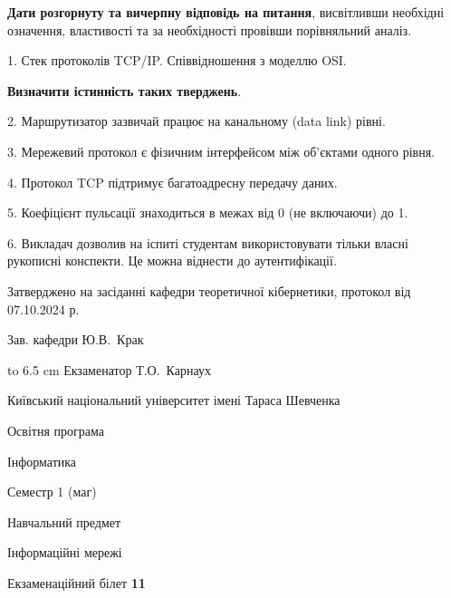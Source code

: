 \documentclass[12pt, ukrainian]{article}
\begin{document}
{
\qquad\textbf{Дати розгорнуту та вичерпну відповідь на питання}, висвітливши необхідні означення, властивості та за необхідності провівши порівняльний аналіз.

1. Стек протоколів TCP/IP. Співвідношення з моделлю OSI.



\qquad\textbf{Визначити істинність таких тверджень}.

2. Маршрутизатор зазвичай працює на канальному (data link) рівні.


3. Мережевий протокол є фізичним інтерфейсом між об'єктами одного рівня.


4. Протокол TCP підтримує багатоадресну передачу даних.


5. Коефіцієнт пульсації знаходиться в межах від 0 (не включаючи) до 1.


6. Викладач дозволив на іспиті студентам використовувати тільки власні рукописні конспекти. Це можна віднести до аутентифікації.

}
{\smallskip\smallskip \begin {scriptsize} Затверджено на засіданні кафедри теоретичної кібернетики, протокол   від   07.10.2024 р.\par\smallskip\smallskip\smallskip\smallskip
{\parbox {6.5 cm} {Зав. кафедри \dotfill Ю.В.~Крак}}\hspace {0.7cm} {\hbox to 6.5 cm { Екзаменатор \dotfill Т.О.~Карнаух}} \end{scriptsize}}
\vspace{0.9cm}
{{\begin {scriptsize}\par
{ \center  Київський національний університет імені Тараса Шевченка \par}
{\parbox {5 cm}{Освітня програма \hfill}{\parbox {7 cm}{Інформатика\hfill}}\parbox {6 cm}{\hfill Семестр 1 (маг)}}\par
{\parbox {5 cm} {Навчальний предмет \hfill}\parbox {7 cm}{Інформаційні мережі \hfill}\parbox {6cm}{\hfill}\par}\vspace{-15pt} \end{scriptsize}}{\center Екзаменаційний білет \No \textbf { 11 }\par}}
\end{document}
